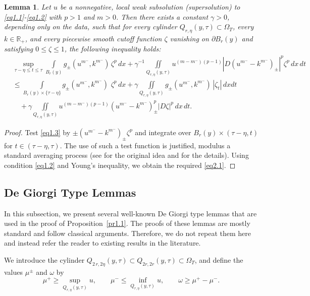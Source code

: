 \documentclass[a4paper,11pt,fullpage]{article}
\numberwithin{equation}{section}
\newtheorem{lemma}{Lemma}[section]
\begin{document}
\begin{lemma}\label{lem2.2}
Let $u$ be a nonnegative, local weak subsolution (supersolution) to \eqref{eq1.1}-\eqref{eq1.2} with $p>1$ and $m>0$. Then there exists a constant $\gamma>0$, depending only on the data, such that for every cylinder $Q_{r,\eta}(y,\tau)\subset\Omega_{T}$, every $k\in\mathbb{R}_{+}$, and every piecewise smooth cutoff function $\zeta$ vanishing on $\partial B_{r}(y)$ and satisfying $0\leqslant \zeta \leqslant 1$, the following inequality holds:
\begin{equation}\label{eq2.1}
\begin{aligned}
&\sup\limits_{\tau-\eta\leqslant t \leqslant \tau}\int\limits_{B_r(y)}g_{\pm}(u^{m^-}, k^{m^-})\,\zeta^{p}\,dx+\gamma^{-1} \iint\limits_{Q_{r,\eta}(y, \tau)}u^{(m-m^-)(p-1)}|D (u^{m^-}-k^{m^-})_{\pm}|^{p}\zeta^{p}\,dx\,dt
\\&\leqslant\int\limits_{B_r(y)\times\{\tau-\eta\}}g_{\pm}(u^{m^-}, k^{m^-})\,\,\zeta^{p}\,dx+\gamma\iint\limits_{Q_{r,\eta}(y, \tau)} g_{\pm}(u^{m^-}, k^{m^-})\,|\zeta_t|\,dx dt
\\&\quad+\gamma \iint\limits_{Q_{r,\eta}(y, \tau)}u^{(m-m^-)(p-1)}(u^{m^-}-k^{m^-})_{\pm}^{p}|D \zeta|^{p}\,dx\,dt.
\end{aligned}
\end{equation}
\end{lemma}
\begin{proof}
Test \eqref{eq1.3} by $\pm (u^{m^-}-k^{m^-})_{\pm}\zeta^{p}$ and integrate over $B_{r}(y)\times(\tau-\eta,t)$ for $t\in(\tau-\eta,\tau)$. The use of such a test function is justified, modulus a standard averaging process (see \cite{KL} for the original idea and \cite{CVV} for the details). Using condition \eqref{eq1.2} and  Young's inequality, we obtain the required \eqref{eq2.1}.
\end{proof} 




\subsection{De Giorgi Type Lemmas}

In this subsection, we present several well-known De Giorgi type lemmas that are used in the proof of Proposition~\ref{pr1.1}. The proofs of these lemmas are mostly standard and follow classical arguments. Therefore, we do not repeat them here and instead refer the reader to existing results in the literature.

 \noindent We introduce the cylinder $Q_{2\,r, 2\eta}(y, \tau)\subset Q_{2r, 2r}(y, \tau) \subset \Omega_T$, and define the values $\mu^{\pm}$ and $\omega$ by
\begin{equation*}
\mu^+\geqslant \sup\limits_{Q_{r, \eta}(y, \tau)} u,
\qquad \mu^-\leqslant \inf\limits_{Q_{r, \eta}(y, \tau)} u,
\qquad \omega\geqslant \mu^+-\mu^-.
\end{equation*}
\end{document}
